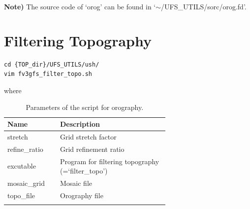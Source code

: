 \documentclass[11pt,fleqn]{report}              %
\begin{document}
{\bf Note)} The source code of `orog' can be found in `$\sim$/UFS\_UTILS/sorc/orog.fd'.




\section{Filtering Topography}
\label{sec:sar_pre_filttopo}

\lstset{language=bash}   
\begin{lstlisting}[frame=trBL]
cd {TOP_dir}/UFS_UTILS/ush/
vim fv3gfs_filter_topo.sh
\end{lstlisting}
where
{
\fontsize{10}{12}\selectfont
\begin{longtable}{p{0.15\linewidth} | p{0.5\linewidth} }
\hline
\hline
Name & Description \\
\hline
 stretch & Grid stretch factor \\
 refine\_ratio & Grid refinement ratio \\
 excutable & Program for filtering topography (=`filter\_topo') \\
 mosaic\_grid & Mosaic file \\
 topo\_file & Orography file \\
\hline
\caption{Parameters of the script for orography.}
\label{table:var_oro_sh}
\end{longtable}
}
\end{document}
